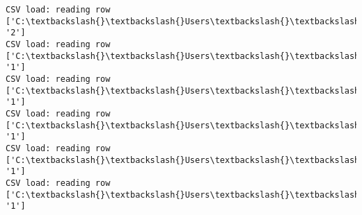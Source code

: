 \documentclass[11pt]{article}
\begin{document}
\begin{Verbatim}[commandchars=\\\{\}]
CSV load: reading row ['C:\textbackslash{}\textbackslash{}Users\textbackslash{}\textbackslash{}AbhishekGangadhar\textbackslash{}\textbackslash{}Downloads\textbackslash{}\textbackslash{}ActionRecog\textbackslash{}\textbackslash{}ActionRecog\textbackslash{}\textbackslash{}DataSets\textbackslash{}\textbackslash{}UCF11\textbackslash{}\textbackslash{}action\_youtube\_naudio\textbackslash{}\textbackslash{}trampoline\_jumping\textbackslash{}\textbackslash{}v\_jumping\_25\textbackslash{}\textbackslash{}v\_jumping\_25\_04.avi', '2']
CSV load: reading row ['C:\textbackslash{}\textbackslash{}Users\textbackslash{}\textbackslash{}AbhishekGangadhar\textbackslash{}\textbackslash{}Downloads\textbackslash{}\textbackslash{}ActionRecog\textbackslash{}\textbackslash{}ActionRecog\textbackslash{}\textbackslash{}DataSets\textbackslash{}\textbackslash{}UCF11\textbackslash{}\textbackslash{}action\_youtube\_naudio\textbackslash{}\textbackslash{}golf\_swing\textbackslash{}\textbackslash{}v\_golf\_04\textbackslash{}\textbackslash{}v\_golf\_04\_01.avi', '1']
CSV load: reading row ['C:\textbackslash{}\textbackslash{}Users\textbackslash{}\textbackslash{}AbhishekGangadhar\textbackslash{}\textbackslash{}Downloads\textbackslash{}\textbackslash{}ActionRecog\textbackslash{}\textbackslash{}ActionRecog\textbackslash{}\textbackslash{}DataSets\textbackslash{}\textbackslash{}UCF11\textbackslash{}\textbackslash{}action\_youtube\_naudio\textbackslash{}\textbackslash{}golf\_swing\textbackslash{}\textbackslash{}v\_golf\_04\textbackslash{}\textbackslash{}v\_golf\_04\_02.avi', '1']
CSV load: reading row ['C:\textbackslash{}\textbackslash{}Users\textbackslash{}\textbackslash{}AbhishekGangadhar\textbackslash{}\textbackslash{}Downloads\textbackslash{}\textbackslash{}ActionRecog\textbackslash{}\textbackslash{}ActionRecog\textbackslash{}\textbackslash{}DataSets\textbackslash{}\textbackslash{}UCF11\textbackslash{}\textbackslash{}action\_youtube\_naudio\textbackslash{}\textbackslash{}golf\_swing\textbackslash{}\textbackslash{}v\_golf\_04\textbackslash{}\textbackslash{}v\_golf\_04\_03.avi', '1']
CSV load: reading row ['C:\textbackslash{}\textbackslash{}Users\textbackslash{}\textbackslash{}AbhishekGangadhar\textbackslash{}\textbackslash{}Downloads\textbackslash{}\textbackslash{}ActionRecog\textbackslash{}\textbackslash{}ActionRecog\textbackslash{}\textbackslash{}DataSets\textbackslash{}\textbackslash{}UCF11\textbackslash{}\textbackslash{}action\_youtube\_naudio\textbackslash{}\textbackslash{}golf\_swing\textbackslash{}\textbackslash{}v\_golf\_04\textbackslash{}\textbackslash{}v\_golf\_04\_04.avi', '1']
CSV load: reading row ['C:\textbackslash{}\textbackslash{}Users\textbackslash{}\textbackslash{}AbhishekGangadhar\textbackslash{}\textbackslash{}Downloads\textbackslash{}\textbackslash{}ActionRecog\textbackslash{}\textbackslash{}ActionRecog\textbackslash{}\textbackslash{}DataSets\textbackslash{}\textbackslash{}UCF11\textbackslash{}\textbackslash{}action\_youtube\_naudio\textbackslash{}\textbackslash{}golf\_swing\textbackslash{}\textbackslash{}v\_golf\_04\textbackslash{}\textbackslash{}v\_golf\_04\_05.avi', '1']

\end{Verbatim}
\end{document}
